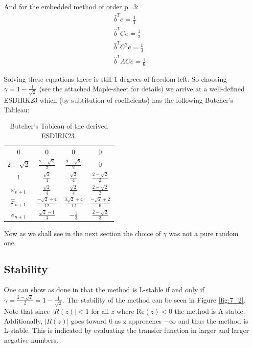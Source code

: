 And for the embedded method of order p=3:
\begin{align*}
    & \hat{b}^T e = \frac{1}{1} \\
    & \hat{b}^T C e = \frac{1}{2} \\
    & \hat{b}^T C^2 e = \frac{1}{3} \\
    & \hat{b}^T A C e = \frac{1}{6}
\end{align*}

Solving these equations there is still 1 degrees of freedom left. So choosing $\gamma=1-\frac{1}{\sqrt{2}}$ (see the attached Maple-sheet for details) we arrive at a well-defined ESDIRK23 which (by subtitution of coefficients) has the following Butcher's Tableau:

\begin{table}[H]
\centering
\begin{tabular}{c|ccc}
0 & 0 & 0 & 0 \\
$2-\sqrt{2}$ & $\frac{2-\sqrt{2}}{2}$  & $\frac{2-\sqrt{2}}{2}$ & 0 \\
$1$ & $\frac{\sqrt{2}}{4}$ & $\frac{\sqrt{2}}{4}$ & $\frac{2-\sqrt{2}}{2}$ \\ \hline
$x_{n+1}$ & $\frac{\sqrt{2}}{4}$ & $\frac{\sqrt{2}}{4}$ & $\frac{2-\sqrt{2}}{2}$ \\
$\hat{x}_{n+1}$ & $\frac{-\sqrt{2}+4}{12}$ & $\frac{3\sqrt{2}+4}{12}$ & $\frac{-\sqrt{2}+2}{6} $ \\ \hline
$e_{n+1}$ & $\frac{\sqrt{2}-1}{3}$ & $-\frac{1}{3}$ & $\frac{2-\sqrt{2}}{3}$
\end{tabular}
\caption{Butcher's Tableau of the derived ESDIRK23.}
\end{table}


Now as we shall see in the next section the choice of $\gamma$ was not a pure random one.

\subsection{Stability}
One can show as done in \cite{JrgensenRunge-KuttaControl} that the method is L-stable if and only if $\gamma = \frac{2-\sqrt{2}}{2} =1-\frac{1}{\sqrt{2}}$. The stability of the method can be seen in Figure \ref{fig:7_2}. Note that since $|R(z)| < 1$ for all $z$ where $\mathrm{Re}(z) < 0$ the method is A-stable. Additionally, $|R(z)|$ goes toward 0 as z approaches $-\infty$ and thus the method is L-stable. This is indicated by evaluating the transfer function in larger and larger negative numbers.

